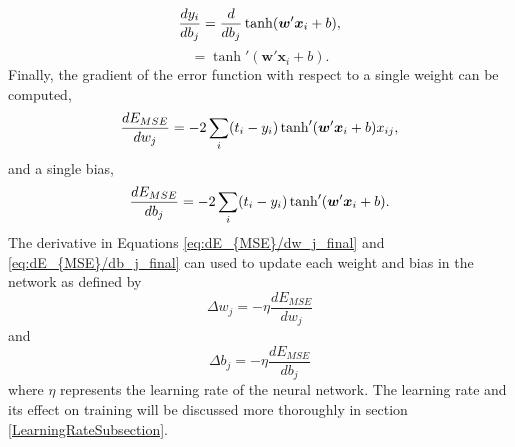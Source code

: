 %
\begin{equation} \label{dE_{MSE}/dw_j}
\frac{dy_i}{db_j} = \frac{d}{db_j} \tanh(\boldsymbol{w}'\boldsymbol{x}_i + b),
\end{equation}
%
\begin{equation} \label{dy_i/db_j}
 = \tanh'( \boldsymbol{w}' \boldsymbol{x}_i + b).
\end{equation}
%
Finally, the gradient of the error function with respect to a single weight can be computed, 
%
\begin{equation} \label{eq:dE_{MSE}/dw_j_final}
\frac{dE_{MSE}}{dw_j} =  -2 \sum_i  (t_i - y_i) \tanh'( \boldsymbol{w}' \boldsymbol{x}_i + b)  x_{ij},
\end{equation}
%
and a single bias,
%
\begin{equation} \label{eq:dE_{MSE}/db_j_final}
\frac{dE_{MSE}}{db_j} =  -2 \sum_i  (t_i - y_i) \tanh'( \boldsymbol{w}' \boldsymbol{x}_i + b).
\end{equation}
%
The derivative in Equations \ref{eq:dE_{MSE}/dw_j_final} and \ref{eq:dE_{MSE}/db_j_final} can used to update each weight and bias in the network as defined by 
%
\begin{equation} \label{eq:update1}
\Delta w_{j} = - \eta \frac{dE_{MSE}}{dw_j}
\end{equation}
%
and 
%
\begin{equation} \label{eq:update2}
\Delta b_{j} = - \eta \frac{dE_{MSE}}{db_j}
\end{equation}
%
where $\eta$ represents the learning rate of the neural network. The learning rate and its effect on training will be discussed more thoroughly in section \ref{LearningRateSubsection}.

